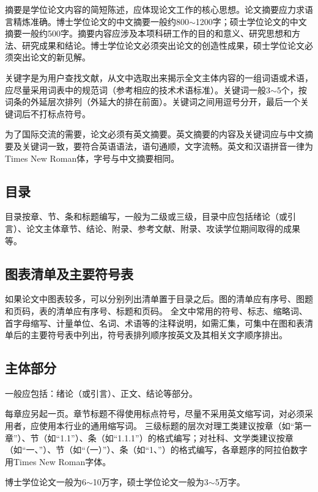 摘要是学位论文内容的简短陈述，应体现论文工作的核心思想。论文摘要应力求语言精炼准确。博士学位论文的中文摘要一般约800$\sim$1200字；硕士学位论文的中文摘要一般约500字。摘要内容应涉及本项科研工作的目的和意义、研究思想和方法、研究成果和结论。博士学位论文必须突出论文的创造性成果，硕士学位论文必须突出论文的新见解。

关键字是为用户查找文献，从文中选取出来揭示全文主体内容的一组词语或术语，应尽量采用词表中的规范词（参考相应的技术术语标准）。关键词一般3$\sim$5个，按词条的外延层次排列（外延大的排在前面）。关键词之间用逗号分开，最后一个关键词后不打标点符号。

为了国际交流的需要，论文必须有英文摘要。英文摘要的内容及关键词应与中文摘要及关键词一致，要符合英语语法，语句通顺，文字流畅。英文和汉语拼音一律为Times New Roman体，字号与中文摘要相同。

\subsection{目录}

目录按章、节、条和标题编写，一般为二级或三级，目录中应包括绪论（或引言）、论文主体章节、结论、附录、参考文献、附录、攻读学位期间取得的成果等。

\subsection{图表清单及主要符号表}

如果论文中图表较多，可以分别列出清单置于目录之后。图的清单应有序号、图题和页码，表的清单应有序号、标题和页码。
全文中常用的符号、标志、缩略词、首字母缩写、计量单位、名词、术语等的注释说明，如需汇集，可集中在图和表清单后的主要符号表中列出，符号表排列顺序按英文及其相关文字顺序排出。

\subsection{主体部分}

一般应包括：绪论（或引言）、正文、结论等部分。

每章应另起一页。章节标题不得使用标点符号，尽量不采用英文缩写词，对必须采用者，应使用本行业的通用缩写词。
三级标题的层次对理工类建议按章（如“第一章”）、节（如“1.1”）、条（如“1.1.1”）的格式编写；对社科、文学类建议按章（如“一、”）、节（如“（一）”）、条（如“1、”）的格式编写，各章题序的阿拉伯数字用Times New Roman字体。

博士学位论文一般为6$\sim$10万字，硕士学位论文一般为3$\sim$5万字。

